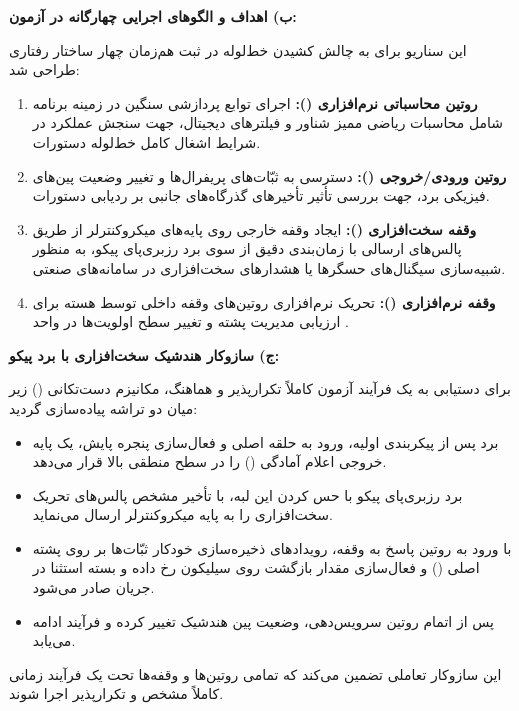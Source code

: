 \vspace{0.4cm}
\noindent
\textbf{ب) اهداف و الگوهای اجرایی چهارگانه در آزمون:}\par
این سناریو برای به چالش کشیدن خط‌لوله در ثبت هم‌زمان چهار ساختار رفتاری طراحی شد:
\begin{enumerate}
    \item \textbf{روتین محاسباتی نرم‌افزاری ():} اجرای توابع پردازشی سنگین در زمینه برنامه شامل محاسبات ریاضی ممیز شناور و فیلترهای دیجیتال، جهت سنجش عملکرد در شرایط اشغال کامل خط‌لوله دستورات.
    \item \textbf{روتین ورودی/خروجی ():} دسترسی به ثبّات‌های پریفرال‌ها و تغییر وضعیت پین‌های فیزیکی برد، جهت بررسی تأثیر تأخیرهای گذرگاه‌های جانبی بر ردیابی دستورات.
    \item \textbf{وقفه سخت‌افزاری ():} ایجاد وقفه خارجی روی پایه‌های  میکروکنترلر از طریق پالس‌های ارسالی با زمان‌بندی دقیق از سوی برد رزبری‌پای پیکو، به منظور شبیه‌سازی سیگنال‌های حسگرها یا هشدارهای سخت‌افزاری در سامانه‌های صنعتی.
    \item \textbf{وقفه نرم‌افزاری ():} تحریک نرم‌افزاری روتین‌های وقفه داخلی توسط هسته برای ارزیابی مدیریت پشته و تغییر سطح اولویت‌ها در واحد .
\end{enumerate}

\vspace{0.4cm}
\noindent
\textbf{ج) سازوکار هندشیک سخت‌افزاری با برد پیکو:}\par
برای دستیابی به یک فرآیند آزمون کاملاً تکرارپذیر و هماهنگ، مکانیزم دست‌تکانی () زیر میان دو تراشه پیاده‌سازی گردید:
\begin{itemize}
    \item برد  پس از پیکربندی اولیه، ورود به حلقه اصلی و فعال‌سازی پنجره پایش، یک پایه خروجی اعلام آمادگی () را در سطح منطقی بالا قرار می‌دهد.
    \item برد رزبری‌پای پیکو با حس کردن این لبه، با تأخیر مشخص پالس‌های تحریک سخت‌افزاری را به پایه  میکروکنترلر ارسال می‌نماید.
    \item با ورود به روتین پاسخ به وقفه، رویدادهای ذخیره‌سازی خودکار ثبّات‌ها بر روی پشته اصلی () و فعال‌سازی مقدار بازگشت  روی سیلیکون رخ داده و بسته استثنا در جریان  صادر می‌شود.
    \item پس از اتمام روتین سرویس‌دهی، وضعیت پین هندشیک تغییر کرده و فرآیند ادامه می‌یابد.
\end{itemize}
این سازوکار تعاملی تضمین می‌کند که تمامی روتین‌ها و وقفه‌ها تحت یک فرآیند زمانی کاملاً مشخص و تکرارپذیر اجرا شوند.

